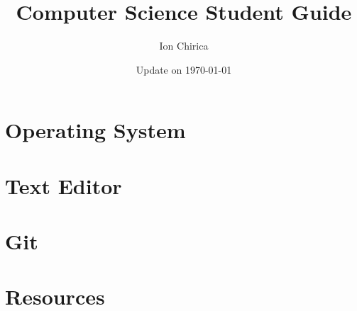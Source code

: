 \documentclass[11pt,oneside]{book}
\begin{document}
\title{\bf \huge Computer Science Student Guide}
\author{Ion Chirica}
\date{Update on \today}
\maketitle
\setcounter{tocdepth}{2}
\setcounter{minitocdepth}{1} 

\begin{multicols}{2}
    \dominitoc%
    \adjustmtc[2]%
    \tableofcontents
    \label{toc-contents}
\end{multicols}



	\printglossary




\part{Operating System}


\part{Text Editor}


\part{Git}


\part{Resources}


% 

\backmatter


\printbibliography[heading=bibintoc]
\printindex
\end{document}

